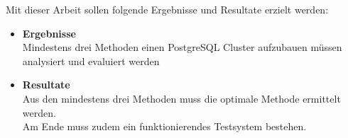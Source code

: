 Mit dieser Arbeit sollen folgende Ergebnisse und Resultate erzielt werden:
\begin{itemize}
    \item \textbf{Ergebnisse} \\ Mindestens drei Methoden einen \Gls{PostgreSQL Cluster} aufzubauen müssen analysiert und evaluiert werden
    \item \textbf{Resultate} \\ Aus den mindestens drei Methoden muss die optimale Methode ermittelt werden. \\ Am Ende muss zudem ein funktionierendes Testsystem bestehen.
\end{itemize}

